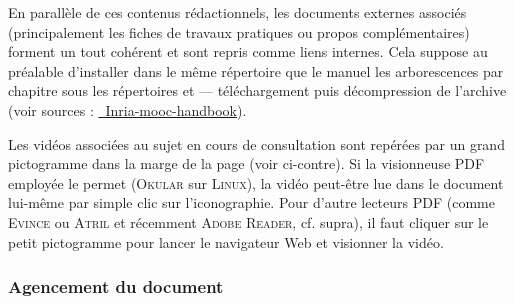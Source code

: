 
En parallèle de ces contenus rédactionnels, les documents externes associés (principalement les fiches de travaux pratiques ou propos complémentaires) forment un tout cohérent et sont repris comme liens internes. 
Cela suppose au préalable d'installer dans le même répertoire que le manuel les arborescences par chapitre sous les répertoires  et  --- téléchargement puis décompression de l'archive (voir sources : \href{https://github.com/ejazzfr/Inria-mooc-handbook}{\faGithub\ Inria-mooc-handbook}).


Les vidéos associées au sujet en cours de consultation sont repérées par un grand pictogramme dans la marge de la page (voir ci-contre). Si la visionneuse PDF employée le permet (\textsc{Okular} sur \textsc{Linux}), la vidéo peut-être lue dans le document lui-même par simple clic sur l'iconographie. Pour d'autre lecteurs PDF (comme \textsc{Evince} ou \textsc{Atril} et récemment \textsc{Adobe Reader}, cf. supra), il faut cliquer sur le petit pictogramme \faTv{} pour lancer le navigateur Web et visionner la vidéo.

\subsubsection*{Agencement du document}

